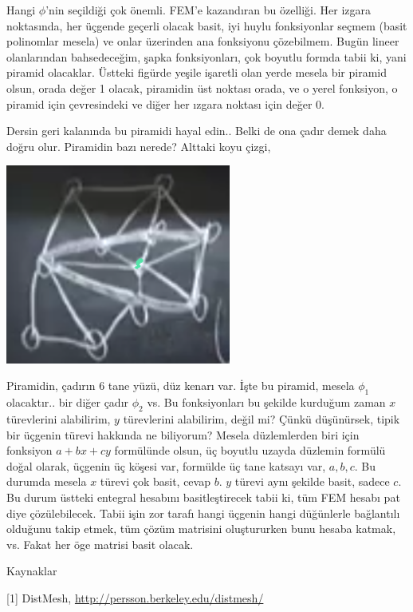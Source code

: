 \documentclass[12pt,fleqn]{article}\usepackage{../../common}
\begin{document}
Hangi $\phi$'nin seçildiği çok önemli. FEM'e kazandıran bu özelliği. Her izgara
noktasında, her üçgende geçerli olacak basit, iyi huylu fonksiyonlar seçmem
(basit polinomlar mesela) ve onlar üzerinden ana fonksiyonu çözebilmem.  Bugün
lineer olanlarından bahsedeceğim, şapka fonksiyonları, çok boyutlu formda tabii
ki, yani piramid olacaklar. Üstteki figürde yeşile işaretli olan yerde mesela
bir piramid olsun, orada değer 1 olacak, piramidin üst noktası orada, ve
o yerel fonksiyon, o piramid için çevresindeki ve diğer her ızgara noktası için
değer 0. 

Dersin geri kalanında bu piramidi hayal edin.. Belki de ona çadır demek daha
doğru olur. Piramidin bazı nerede? Alttaki koyu çizgi,

\includegraphics[width=20em]{compscieng_1_26_02.png}

Piramidin, çadırın 6 tane yüzü, düz kenarı var. İşte bu piramid, mesela $\phi_1$
olacaktır.. bir diğer çadır $\phi_2$ vs. Bu fonksiyonları bu şekilde kurduğum
zaman $x$ türevlerini alabilirim, $y$ türevlerini alabilirim, değil mi?
Çünkü düşünürsek, tipik bir üçgenin türevi hakkında ne biliyorum? Mesela
düzlemlerden biri için fonksiyon $a + bx + cy$ formülünde olsun, üç boyutlu
uzayda düzlemin formülü doğal olarak, üçgenin üç köşesi var, formülde üç tane
katsayı var, $a,b,c$. Bu durumda mesela $x$ türevi çok basit, cevap $b$. $y$
türevi aynı şekilde basit, sadece $c$. Bu durum üstteki entegral hesabını
basitleştirecek tabii ki, tüm FEM hesabı pat diye çözülebilecek. Tabii işin
zor tarafı hangi üçgenin hangi düğünlerle bağlantılı olduğunu takip etmek,
tüm çözüm matrisini oluştururken bunu hesaba katmak, vs. Fakat her öge
matrisi basit olacak. 

Kaynaklar

[1] DistMesh, \url{http://persson.berkeley.edu/distmesh/}
\end{document}
